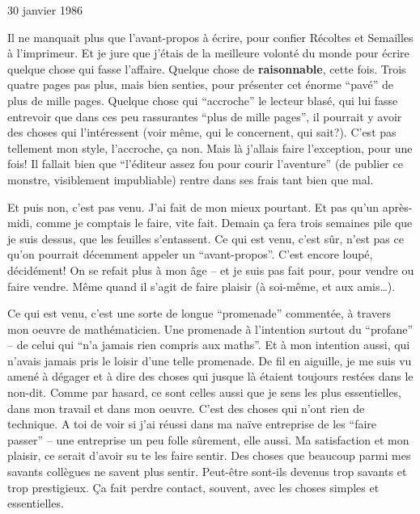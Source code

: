 30 janvier 1986

Il ne manquait plus que l'avant-propos à écrire, pour confier Récoltes et Semailles à l'imprimeur. Et je jure que j'étais de la meilleure volonté du monde pour écrire quelque chose qui fasse l'affaire. Quelque chose de \textbf{raisonnable}, cette fois. Trois quatre pages pas plus, mais bien senties, pour présenter cet énorme ``pavé'' de plus de mille pages. Quelque chose qui ``accroche'' le lecteur blasé, qui lui fasse entrevoir que dans ces peu rassurantes ``plus de mille pages'', il pourrait y avoir des choses qui l'intéressent (voir même, qui le concernent, qui sait?). C'est pas tellement mon style, l'accroche, ça non. Mais là j'allais faire l'exception, pour une fois! Il fallait bien que ``l'éditeur assez fou pour courir l'aventure'' (de publier ce monstre, visiblement impubliable) rentre dans ses frais tant bien que mal.

Et puis non, c'est pas venu. J'ai fait de mon mieux pourtant. Et pas qu'un après-midi, comme je comptais le faire, vite fait. Demain ça fera trois semaines pile que je suis dessus, que les feuilles s'entassent. Ce qui est venu, c'est sûr, n'est pas ce qu'on pourrait décemment appeler un ``avant-propos''. C'est encore loupé, décidément! On se refait plus à mon âge -- et je suis pas fait pour, pour vendre ou faire vendre. Même quand il s'agit de faire plaisir (à soi-même, et aux amis\ldots).

Ce qui est venu, c'est une sorte de longue ``promenade'' commentée, à travers mon oeuvre de mathématicien. Une promenade à l'intention surtout du ``profane'' -- de celui qui ``n'a jamais rien compris aux maths''. Et à mon intention aussi, qui n'avais jamais pris le loisir d'une telle promenade. De fil en aiguille, je me suis vu amené à dégager et à dire des choses qui jusque là étaient toujours restées dans le non-dit. Comme par hasard, ce sont celles aussi que je sens les plus essentielles, dans mon travail et dans mon oeuvre. C'est des choses qui n'ont rien de technique. A toi de voir si j'ai réussi dans ma naïve entreprise de les ``faire passer'' -- une entreprise un peu folle sûrement, elle aussi. Ma satisfaction et mon plaisir, ce serait d'avoir su te les faire sentir. Des choses que beaucoup parmi mes savants collègues ne savent plus sentir. Peut-être sont-ils devenus trop savants et trop prestigieux. Ça fait perdre contact, souvent, avec les choses simples et essentielles.

